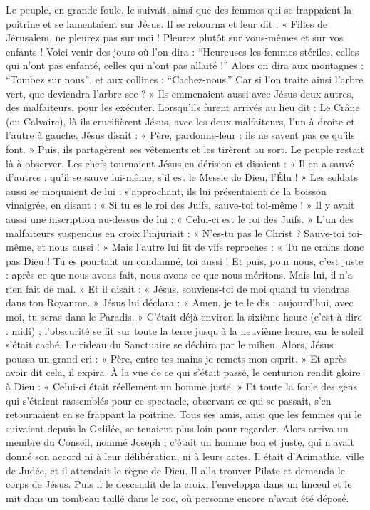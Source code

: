  Le peuple, en grande foule, le suivait, ainsi que des femmes qui se frappaient la poitrine et se lamentaient sur Jésus.
 Il se retourna et leur dit : « Filles de Jérusalem, ne pleurez pas sur moi ! Pleurez plutôt sur vous-mêmes et sur vos enfants !
 Voici venir des jours où l’on dira : “Heureuses les femmes stériles, celles qui n’ont pas enfanté, celles qui n’ont pas allaité !”
 Alors on dira aux montagnes : “Tombez sur nous”, et aux collines : “Cachez-nous.”
 Car si l’on traite ainsi l’arbre vert, que deviendra l’arbre sec ? »
 Ils emmenaient aussi avec Jésus deux autres, des malfaiteurs, pour les exécuter.
 Lorsqu’ils furent arrivés au lieu dit : Le Crâne (ou Calvaire), là ils crucifièrent Jésus, avec les deux malfaiteurs, l’un à droite et l’autre à gauche.
 Jésus disait : « Père, pardonne-leur : ils ne savent pas ce qu’ils font. » Puis, ils partagèrent ses vêtements et les tirèrent au sort.
 Le peuple restait là à observer. Les chefs tournaient Jésus en dérision et disaient : « Il en a sauvé d’autres : qu’il se sauve lui-même, s’il est le Messie de Dieu, l’Élu ! »
 Les soldats aussi se moquaient de lui ; s’approchant, ils lui présentaient de la boisson vinaigrée,
 en disant : « Si tu es le roi des Juifs, sauve-toi toi-même ! »
 Il y avait aussi une inscription au-dessus de lui : « Celui-ci est le roi des Juifs. »
 L’un des malfaiteurs suspendus en croix l’injuriait : « N’es-tu pas le Christ ? Sauve-toi toi-même, et nous aussi ! »
 Mais l’autre lui fit de vifs reproches : « Tu ne crains donc pas Dieu ! Tu es pourtant un condamné, toi aussi !
 Et puis, pour nous, c’est juste : après ce que nous avons fait, nous avons ce que nous méritons. Mais lui, il n’a rien fait de mal. »
 Et il disait : « Jésus, souviens-toi de moi quand tu viendras dans ton Royaume. »
 Jésus lui déclara : « Amen, je te le dis : aujourd’hui, avec moi, tu seras dans le Paradis. »
 C’était déjà environ la sixième heure (c’est-à-dire : midi) ; l’obscurité se fit sur toute la terre jusqu’à la neuvième heure,
 car le soleil s’était caché. Le rideau du Sanctuaire se déchira par le milieu.
  Alors, Jésus poussa un grand cri : « Père, entre tes mains je remets mon esprit. » Et après avoir dit cela, il expira.
 À la vue de ce qui s’était passé, le centurion rendit gloire à Dieu : « Celui-ci était réellement un homme juste. »
 Et toute la foule des gens qui s’étaient rassemblés pour ce spectacle, observant ce qui se passait, s’en retournaient en se frappant la poitrine.
 Tous ses amis, ainsi que les femmes qui le suivaient depuis la Galilée, se tenaient plus loin pour regarder.
 Alors arriva un membre du Conseil, nommé Joseph ; c’était un homme bon et juste,
 qui n’avait donné son accord ni à leur délibération, ni à leurs actes. Il était d’Arimathie, ville de Judée, et il attendait le règne de Dieu.
 Il alla trouver Pilate et demanda le corps de Jésus.
 Puis il le descendit de la croix, l’enveloppa dans un linceul et le mit dans un tombeau taillé dans le roc, où personne encore n’avait été déposé.